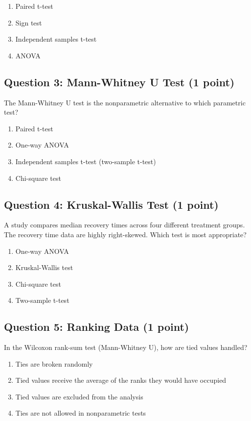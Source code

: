 \documentclass[10pt]{article}
\begin{document}
\begin{enumerate}[label=\Alph*., leftmargin=20pt]
\item Paired t-test
\item Sign test
\item Independent samples t-test
\item ANOVA
\end{enumerate}

\subsection*{Question 3: Mann-Whitney U Test (1 point)}

The Mann-Whitney U test is the nonparametric alternative to which parametric test?

\begin{enumerate}[label=\Alph*., leftmargin=20pt]
\item Paired t-test
\item One-way ANOVA
\item Independent samples t-test (two-sample t-test)
\item Chi-square test
\end{enumerate}

\subsection*{Question 4: Kruskal-Wallis Test (1 point)}

A study compares median recovery times across four different treatment groups. The recovery time data are highly right-skewed. Which test is most appropriate?

\begin{enumerate}[label=\Alph*., leftmargin=20pt]
\item One-way ANOVA
\item Kruskal-Wallis test
\item Chi-square test
\item Two-sample t-test
\end{enumerate}

\subsection*{Question 5: Ranking Data (1 point)}

In the Wilcoxon rank-sum test (Mann-Whitney U), how are tied values handled?

\begin{enumerate}[label=\Alph*., leftmargin=20pt]
\item Ties are broken randomly
\item Tied values receive the average of the ranks they would have occupied
\item Tied values are excluded from the analysis
\item Ties are not allowed in nonparametric tests
\end{enumerate}
\end{document}
